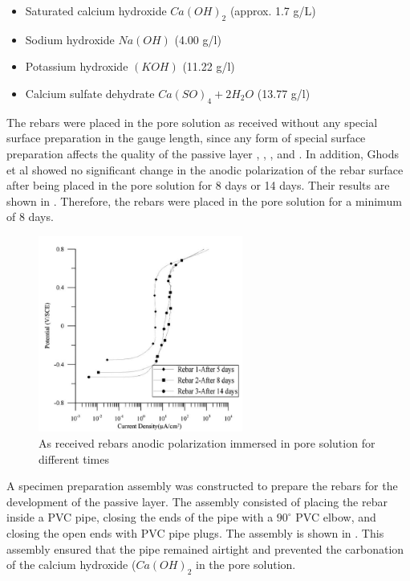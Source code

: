 \begin{itemize}
	\item Saturated calcium hydroxide $Ca(OH)_2$ (approx. 1.7 g/L)
	\item Sodium hydroxide $Na(OH)$ (4.00 g/l)
	\item Potassium hydroxide $(KOH)$ (11.22 g/l)
	\item Calcium sulfate dehydrate $Ca(SO)_4 + 2H_2O$ (13.77 g/l)
\end{itemize}

The rebars were placed in the pore solution as received without any special surface preparation in the gauge length, since any  form of special surface preparation affects the quality of  the passive layer \cite{Andersson1989}, \cite{DawnMarcotte2001}, \cite{Moragues1987}, and \cite{Page1983}. In addition, Ghods et al showed no significant change in the anodic polarization of the rebar surface after being placed in the pore solution for 8 days or 14 days. Their results are shown in . Therefore, the rebars were placed in the pore solution for a minimum of 8 days. 

\begin{figure}[htbp]
	\centering
	\includegraphics[width=0.6\textwidth]{Chapter-3/figs/AsReceived_AnodicPolarization_time}
	\caption{As received rebars anodic polarization immersed in pore solution for different times\cite{Ghods2009}}
	\label{fig:GhodsRebarPassivation}
\end{figure}

A specimen preparation assembly was constructed to prepare the rebars for the development of the passive layer. The assembly consisted of placing the rebar inside a PVC pipe, closing the ends of the pipe with a $90^{\circ}$ PVC elbow, and closing the open ends with PVC pipe plugs. The assembly is shown in . This assembly ensured that the pipe remained airtight and prevented the carbonation of the calcium hydroxide ($Ca(OH)_{2}$ in the pore solution.

